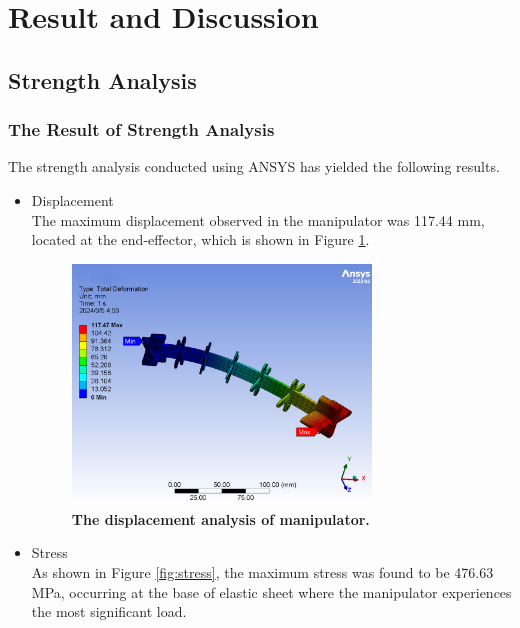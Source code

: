 \section{Result and Discussion} 
\subsection{Strength Analysis}
\subsubsection{The Result of Strength Analysis}
The strength analysis conducted using ANSYS has yielded the following results.
\begin{itemize}
    \item Displacement \\
    The maximum displacement observed in the manipulator was 117.44 mm, located at the end-effector, which is shown 
    in Figure \ref{fig:displacement}.
    \begin{figure}[H] %
        \centering 
        \captionsetup{labelsep=colon}
        \includegraphics[width=0.75\textwidth]{Image/Result/displacement.png} 
        \caption[The displacement analysis of manipulator]
        {\centering \textbf{The displacement analysis of manipulator.}}
        \label{fig:displacement}
    \end{figure}
    \item Stress \\
    As shown in Figure \ref{fig:stress}, the maximum stress was found to be 476.63 MPa, occurring at the base of 
    elastic sheet where the manipulator experiences the most significant load. 
    \begin{figure}[H] %

\end{figure}
\end{itemize}

